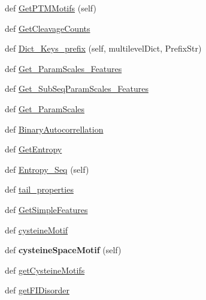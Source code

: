 \begin{DoxyCompactItemize}
\item 
def \hyperlink{classfeat__extract_1_1_prot_feat_1_1_prot_feat_ac7bf4d24db5ee443363b023dd9a8f120}{Get\+P\+T\+M\+Motifs} (self)
\item 
def \hyperlink{classfeat__extract_1_1_prot_feat_1_1_prot_feat_a3870adebee4ffffdab545c2f79e09dea}{Get\+Cleavage\+Counts}
\item 
def \hyperlink{classfeat__extract_1_1_prot_feat_1_1_prot_feat_ae11f6df3b4efbe4e0975089b5a255c7a}{Dict\+\_\+\+Keys\+\_\+prefix} (self, multilevel\+Dict, Prefix\+Str)
\item 
def \hyperlink{classfeat__extract_1_1_prot_feat_1_1_prot_feat_a58835d011020b381bdd83d77220d38e9}{Get\+\_\+\+Param\+Scales\+\_\+\+Features}
\item 
def \hyperlink{classfeat__extract_1_1_prot_feat_1_1_prot_feat_a41c12ab62255724b9aa96a04700655df}{Get\+\_\+\+Sub\+Seq\+Param\+Scales\+\_\+\+Features}
\item 
def \hyperlink{classfeat__extract_1_1_prot_feat_1_1_prot_feat_af7aeb76a124e0b2d6437c62525d76917}{Get\+\_\+\+Param\+Scales}
\item 
def \hyperlink{classfeat__extract_1_1_prot_feat_1_1_prot_feat_a55fee91bd4a79b007cbacc83d20b70f7}{Binary\+Autocorrellation}
\item 
def \hyperlink{classfeat__extract_1_1_prot_feat_1_1_prot_feat_a24e9a7e4395849f24708b5c29cd61eb0}{Get\+Entropy}
\item 
def \hyperlink{classfeat__extract_1_1_prot_feat_1_1_prot_feat_ac133108c6d07aa0f3037758307df04a2}{Entropy\+\_\+\+Seq} (self)
\item 
def \hyperlink{classfeat__extract_1_1_prot_feat_1_1_prot_feat_a06c37ba385c6fa7e877e27a986c273ee}{tail\+\_\+properties}
\item 
def \hyperlink{classfeat__extract_1_1_prot_feat_1_1_prot_feat_aaffaab7c26455e14f5317d574a428e1c}{Get\+Simple\+Features}
\item 
def \hyperlink{classfeat__extract_1_1_prot_feat_1_1_prot_feat_a15b15dca5d5f7374c06f6d27fd11699a}{cysteine\+Motif}
\item 
\hypertarget{classfeat__extract_1_1_prot_feat_1_1_prot_feat_a4bea8b23af186ae22772ad19d1155206}{}def {\bfseries cysteine\+Space\+Motif} (self)\label{classfeat__extract_1_1_prot_feat_1_1_prot_feat_a4bea8b23af186ae22772ad19d1155206}

\item 
def \hyperlink{classfeat__extract_1_1_prot_feat_1_1_prot_feat_a63273ac1c666696e0c4a3d5abb4480eb}{get\+Cysteine\+Motifs}
\item 
def \hyperlink{classfeat__extract_1_1_prot_feat_1_1_prot_feat_ade3d514c79ce995aac26b9744212a9f5}{get\+F\+I\+Disorder}
\end{DoxyCompactItemize}
